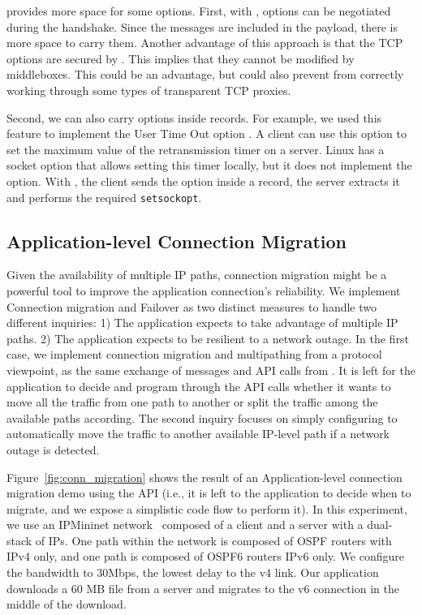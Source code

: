 \tcpls provides more space for some \tcp options. First, with \tcpls, \tcp
options can be negotiated during the \tls handshake. Since the \tls messages are
included in the \tcp payload, there is more space to carry them. Another
advantage of this approach is that the TCP options are secured by \tls. This
implies that they cannot be modified by middleboxes. This could be an advantage,
but could also prevent \tcpls from correctly working through some types of
transparent TCP proxies.

Second, we can also carry \tcp options inside \tls records. For example, we used
this feature to implement the \tcp User Time Out option \cite{rfc5482}. A client
can use this option to set the maximum value of the retransmission
timer on a server. Linux \tcp has a socket option that allows setting
this timer locally, but it does not implement the option. With \tcpls, the client sends the option inside a \tls record, the server extracts it
and performs the required \texttt{setsockopt}. 


\subsection{Application-level Connection Migration}
\label{sec:connmigr}

Given the availability of multiple IP paths, connection migration might be a
powerful tool to improve the application connection's reliability.  We
implement Connection migration and Failover as two distinct measures to handle
two different inquiries: 1) The application expects to take advantage of multiple
IP paths. 2) The application expects to be resilient to a network outage. In the
first case, we implement connection migration and multipathing from a
protocol viewpoint, as the same exchange of messages and API calls from \tcpls.
It is left for the application to decide and program
through the API calls whether it wants to move all the traffic from one path to
another or split the traffic among the available paths according. The second
inquiry focuses on simply configuring \tcpls to automatically move the traffic to
another available IP-level path if a network outage is detected. 

Figure~\ref{fig:conn_migration} shows the result of an Application-level
connection migration demo using the API (i.e., it is left to the
application to decide when to migrate, and we expose a simplistic code flow to
perform it). In this experiment, we use an IPMininet network~\cite{ipmininet, jadin2020educational}
composed of a client and a server with a dual-stack of IPs. One path within the
network is composed of OSPF routers with IPv4 only, and one path is composed of
OSPF6 routers IPv6 only. We configure the bandwidth to 30Mbps, the lowest delay
to the v4 link. Our application
downloads a 60 MB file from a server and migrates to the v6 connection in
the middle of the download.

